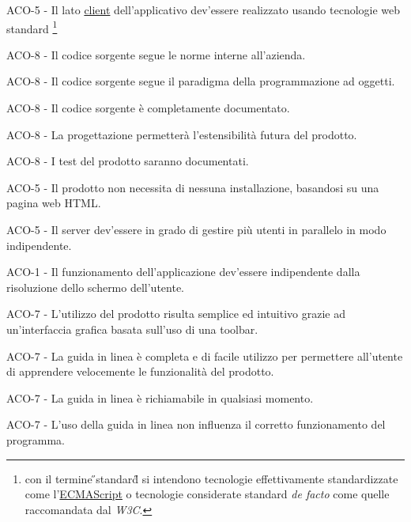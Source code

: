 \begin{elenconumerato}{\subsubsecindent}
\item ACO-5 - Il lato {\underline{client}} dell'applicativo dev'essere realizzato usando tecnologie web standard
\footnote{con il termine \H{}standard\H{} si intendono tecnologie effettivamente standardizzate come l'\underline{ECMAScript} o tecnologie considerate standard \textit{de facto} come quelle raccomandata dal \textit{W3C}.}
\item ACO-8 - Il codice sorgente segue le norme interne all'azienda.
\item ACO-8 - Il codice sorgente segue il paradigma della programmazione ad oggetti.
\item ACO-8 - Il codice sorgente \`e completamente documentato.
\item ACO-8 - La progettazione permetter\`a l'estensibilit\`a futura del prodotto.
\item ACO-8 - I test del prodotto saranno documentati.
\item ACO-5 - Il prodotto non necessita di nessuna installazione, basandosi su una pagina web HTML.
\item ACO-5 - Il server dev'essere in grado di gestire pi\`u utenti in parallelo in modo indipendente.
\item ACO-1 - Il funzionamento dell'applicazione dev'essere indipendente dalla risoluzione dello schermo dell'utente.
\end{elenconumerato}



\begin{elenconumerato}{\subsubsecindent}
\item ACO-7 - L'utilizzo del prodotto risulta semplice ed intuitivo grazie ad un'interfaccia grafica basata sull'uso di una toolbar.
\item ACO-7 - La guida in linea \`e completa e di facile utilizzo per permettere all'utente di apprendere velocemente le funzionalit\`a del prodotto.
\item ACO-7 - La guida in linea \`e richiamabile in qualsiasi momento.
\item ACO-7 - L'uso della guida in linea non influenza il corretto funzionamento del programma. 
\end{elenconumerato}

